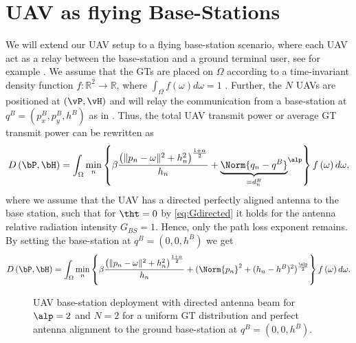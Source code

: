 \section{UAV as flying Base-Stations}
%
We will extend our UAV setup to a flying base-station scenario, where each UAV act as a relay between the base-station
and a ground terminal user, see for example \cite{AG18}.
We assume that the GTs are placed on $\Omega$ according to a time-invariant density function
$f:\mathbb{R}^2\to\mathbb{R}$, where $\int_{\Omega}f(\omega)d\omega=1$ \cite{GJ,Erdem1,ML,MLCS}. Further, the $N$ UAVs
are positioned at $(\vP,\vH)$ and will relay the communication from a base-station at $q^B=(p^B_x,p^B_y,h^B)$
as in . Thus, the total UAV
transmit power or average GT transmit power can be rewritten as
%
\begin{equation}
D\left(\bP,\bH\right)=\int_{\Omega}\min_{n}\left\{\beta\frac{\left(\|p_n-\omega\|^2+h^2_n\right)^{\frac{1+\alpha}{2}}}{h_n}
+ {\underbrace{\Norm{q_n-q^B}}_{=d_n^B}}^{{\alp}}\right\}f\left(\omega\right)d\omega,
\label{eq:Dbasestation}
\end{equation}
%
where we assume that the UAV has a directed perfectly aligned antenna to the base station, such that for $\tht=0$ by
\eqref{eq:Gdirected} it holds for the antenna relative radiation intensity $G_{BS}=1$. Hence, only the path loss exponent remains.
By setting the base-station at $q^B=(0,0,h^B)$ we get
\begin{align}
D\left(\bP,\bH\right)=\int_{\Omega}\min_{n}\left\{\beta\frac{\left(\|p_n-\omega\|^2+h^2_n\right)^{\frac{1+\alpha}{2}}}{h_n}
+ (\Norm{p_n}^2+(h_n-h^B)^2)^{\frac{\alp}{2}}\right\}f\left(\omega\right)d\omega.
\label{eq:Dbasestation2}
\end{align}

%
\begin{figure}
  \centering
  \def\svgwidth{.9\textwidth} \scriptsize{
    }
    \caption{UAV base-station deployment with directed antenna beam for $\alp=2$ and $N=2$ for a uniform GT distribution
    and perfect antenna alignment to the ground base-station at $q^B=(0,0,h^B)$.}
    \label{fig:uavbasestation}
\end{figure}

